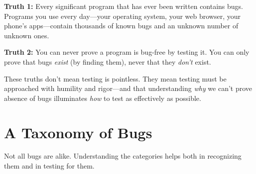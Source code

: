 \documentclass[11pt,letterpaper]{article}
\begin{document}
\begin{conceptbox}
\textbf{Truth 1:} Every significant program that has ever been written contains bugs. Programs you use every day---your operating system, your web browser, your phone's apps---contain thousands of known bugs and an unknown number of unknown ones.

\textbf{Truth 2:} You can never prove a program is bug-free by testing it. You can only prove that bugs \textit{exist} (by finding them), never that they \textit{don't} exist.

These truths don't mean testing is pointless. They mean testing must be approached with humility and rigor---and that understanding \textit{why} we can't prove absence of bugs illuminates \textit{how} to test as effectively as possible.
\end{conceptbox}

\section{A Taxonomy of Bugs}

Not all bugs are alike. Understanding the categories helps both in recognizing them and in testing for them.
\end{document}
